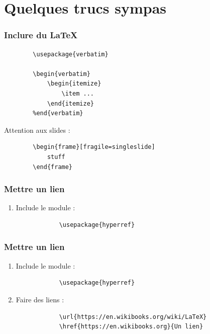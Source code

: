 \documentclass[handout]{beamer}
\begin{document}
\section{Quelques trucs sympas}

\begin{frame}[fragile=singleslide]
	\frametitle{Inclure du \LaTeX}

	\centering

	\begin{verbatim}
		\usepackage{verbatim}

		\begin{verbatim}
			\begin{itemize}
				\item ...
			\end{itemize}
		%end{verbatim}

	\end{verbatim}

	Attention aux slides :\\
	\begin{verbatim}
		\begin{frame}[fragile=singleslide]
			stuff
		\end{frame}
	\end{verbatim}

\end{frame}

\begin{frame}[fragile=singleslide]
	\frametitle{Mettre un lien}

	\begin{enumerate}
		\item Include le module :\\
			\begin{verbatim}
			\usepackage{hyperref}
			\end{verbatim}
	\end{enumerate}
\end{frame}

\begin{frame}[fragile=singleslide]
	\frametitle{Mettre un lien}

	\begin{enumerate}
		\item Include le module :\\
			\begin{verbatim}
			\usepackage{hyperref}
			\end{verbatim}
		\item Faire des liens :\\
			\begin{verbatim}
			\url{https://en.wikibooks.org/wiki/LaTeX}
			\href{https://en.wikibooks.org}{Un lien}
			\end{verbatim}
	\end{enumerate}
\end{frame}
\end{document}
